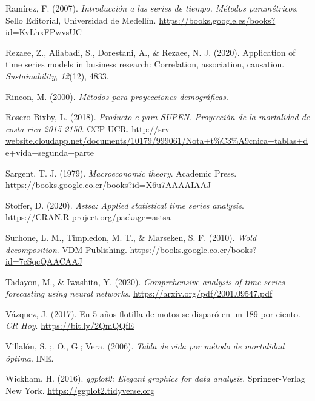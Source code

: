 \documentclass[
]{article}
\newlength{\cslhangindent}
\newlength{\cslentryspacingunit} %
\newenvironment{CSLReferences}[2] %
 {%
  \setlength{\parindent}{0pt}
  \ifodd #1
  \let\oldpar\par
  \def\par{\hangindent=\cslhangindent\oldpar}
  \fi
  \setlength{\parskip}{#2\cslentryspacingunit}
 }%
 {}
\begin{document}
\begin{CSLReferences}{1}{0}
\leavevmode{}%
Ramírez, F. (2007). \emph{Introducción a las series de tiempo. Métodos
paramétricos}. Sello Editorial, Universidad de Medellín.
\url{https://books.google.es/books?id=KvLhxFPwvsUC}

\leavevmode{}%
Rezaee, Z., Aliabadi, S., Dorestani, A., \& Rezaee, N. J. (2020).
Application of time series models in business research: Correlation,
association, causation. \emph{Sustainability}, \emph{12}(12), 4833.

\leavevmode{}%
Rincon, M. (2000). \emph{Métodos para proyecciones demográficas}.

\leavevmode{}%
Rosero-Bixby, L. (2018). \emph{Producto c para SUPEN. Proyección de la
mortalidad de costa rica 2015-2150}. CCP-UCR.
\url{http://srv-website.cloudapp.net/documents/10179/999061/Nota+t\%C3\%A9cnica+tablas+de+vida+segunda+parte}

\leavevmode{}%
Sargent, T. J. (1979). \emph{Macroeconomic theory}. Academic Press.
\url{https://books.google.co.cr/books?id=X6u7AAAAIAAJ}

\leavevmode{}%
Stoffer, D. (2020). \emph{Astsa: Applied statistical time series
analysis}. \url{https://CRAN.R-project.org/package=astsa}

\leavevmode{}%
Surhone, L. M., Timpledon, M. T., \& Marseken, S. F. (2010). \emph{Wold
decomposition}. VDM Publishing.
\url{https://books.google.co.cr/books?id=7cSqcQAACAAJ}

\leavevmode{}%
Tadayon, M., \& Iwashita, Y. (2020). \emph{Comprehensive analysis of
time series forecasting using neural networks}.
\url{https://arxiv.org/pdf/2001.09547.pdf}

\leavevmode{}%
Vázquez, J. (2017). En 5 años flotilla de motos se disparó en un 189 por
ciento. \emph{CR Hoy}. \url{https://bit.ly/2QmQQfE}

\leavevmode{}%
Villalón, S. ;. O., G.; Vera. (2006). \emph{Tabla de vida por método de
mortalidad óptima}. INE.

\leavevmode{}%
Wickham, H. (2016). \emph{ggplot2: Elegant graphics for data analysis}.
Springer-Verlag New York. \url{https://ggplot2.tidyverse.org}


\end{CSLReferences}
\end{document}
